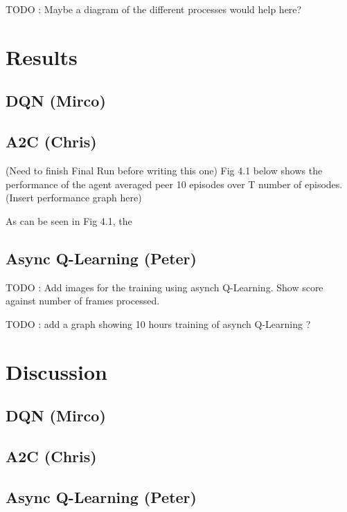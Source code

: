 \documentclass{article}
\begin{document}
TODO : Maybe a diagram of the different processes would help here?


\section{Results}


\subsection{DQN (Mirco)}
\subsection{A2C (Chris)}

(Need to finish Final Run before writing this one)
Fig 4.1 below shows the performance of the agent averaged peer 10 episodes over T number of episodes.
(Insert performance graph here)

As can be seen in Fig 4.1, the

\subsection{Async Q-Learning (Peter)}

TODO : Add images for the training using asynch Q-Learning.
Show score against number of frames processed.

TODO : add a graph showing 10 hours training of asynch Q-Learning ?

\section{Discussion}
    

\subsection{DQN (Mirco)}

\subsection{A2C (Chris)}
\subsection{Async Q-Learning (Peter)}
\end{document}
